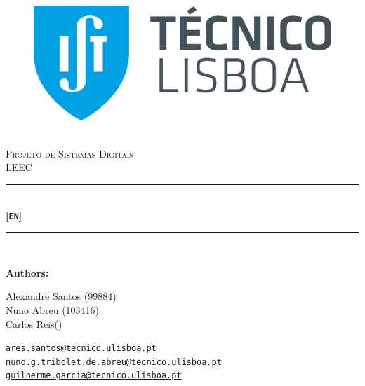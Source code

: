 \documentclass[12pt]{article}
\newcommand{\HRule}{\rule{\linewidth}{0.5mm}} %
\begin{document}
\begin{center}
    \begin{figure}
        \vspace{-1.0cm}
        \includegraphics[scale = 0.3, left]{Imagens/IST_A.eps} %
    \end{figure}
    \mbox{}\\[2.0cm]
    \textsc{\Huge Projeto de Sistemas Digitais}\\[2.5cm]
    \textsc{\LARGE LEEC}\\[2.0cm]
    \HRule\\[0.4cm]
    {\large \bf {\selectfont } [\texttt{EN}]}\\[0.2cm]
    \HRule\\[1.5cm]
\end{center}

\begin{flushleft}
    \textbf{\selectfont Authors:}
\end{flushleft}

\begin{center}
    \begin{minipage}{0.4\textwidth}
        \begin{flushleft}
            Alexandre Santos (99884)\\
            Nuno Abreu (103416)\\
            Carlos Reis()\\
        \end{flushleft}
    \end{minipage}%
    \begin{minipage}{0.6\textwidth}
        \begin{flushright}
            \href{mailto:ares.santos@tecnico.ulisboa.pt}{\texttt{ares.santos@tecnico.ulisboa.pt}}\\
            \href{mailto:nuno.g.tribolet.de.abreu@tecnico.ulisboa.pt}{\texttt{nuno.g.tribolet.de.abreu@tecnico.ulisboa.pt}}\\
            \href{mailto:guilherme.garcia@tecnico.ulisboa.pt}{\texttt{guilherme.garcia@tecnico.ulisboa.pt}}\\
            
        \end{flushright}
    \end{minipage}


\end{center}
    
\end{document}
